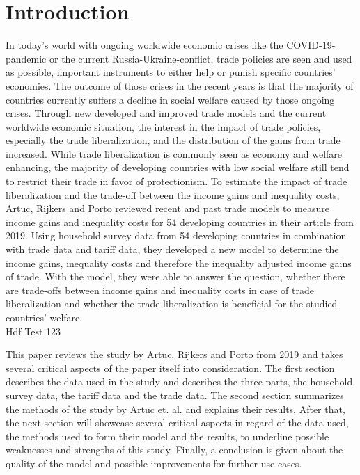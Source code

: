 \chapter{Introduction}
In today's world with ongoing worldwide economic crises like the COVID-19-pandemic or the current Russia-Ukraine-conflict,
trade policies are seen and used as possible, important instruments to either help or punish specific countries' economies. 
The outcome of those crises in the recent years is that the majority of countries currently suffers a decline in social welfare 
caused by those ongoing crises. Through new developed and improved trade models and the current worldwide economic situation, the interest 
in the impact of trade policies, especially the trade liberalization, and the distribution of the gains from trade increased. 
While trade liberalization is commonly seen as economy and welfare enhancing, the majority of developing countries with low social welfare
still tend to restrict their trade in favor of protectionism. To estimate the impact of trade liberalization and the trade-off
between the income gains and inequality costs, Artuc, Rijkers and Porto reviewed recent and past trade models to measure 
income gains and inequality costs for 54 developing countries in their article from 2019. Using household survey data from 54
developing countries in combination with trade data and tariff data, they developed a new model to determine the income gains,
inequality costs and therefore the inequality adjusted income gains of trade. With the model, they were able to answer the
question, whether there are trade-offs between income gains and inequality costs in case of trade liberalization and whether
the trade liberalization is beneficial for the studied countries' welfare.\\

Hdf Test 123

This paper reviews the study by Artuc, Rijkers and Porto from 2019 and takes several critical aspects of the paper itself into consideration.
The first section describes the data used in the study and describes the three parts, the household survey data, the tariff data
and the trade data. The second section summarizes the methods of the study by Artuc et. al. and explains their results.
After that, the next section will showcase several critical aspects in regard of the data used, 
the methods used to form their model and the results, to underline possible weaknesses and strengths of this study. 
Finally, a conclusion is given about the quality of the model and possible improvements for further use cases. 
